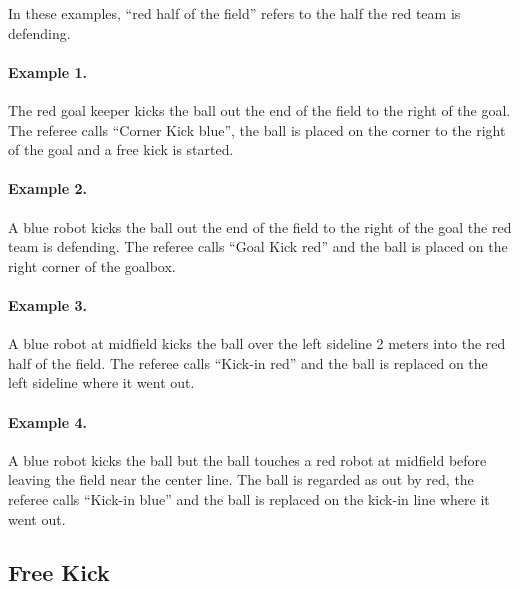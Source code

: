 \documentclass[12pt]{article}
\begin{document}

In these examples, ``red half of the field'' refers to the half the red team is defending.

\paragraph{Example 1.} The red goal keeper kicks the ball out the end of the field to the right of the goal. The referee calls ``Corner Kick blue'', the ball is placed on the corner to the right of the goal and a free kick is started.

\paragraph{Example 2.} A blue robot kicks the ball out the end of the field to the right of the goal the red team is defending. The referee calls ``Goal Kick red'' and the ball is placed on the right corner of the goalbox.

\paragraph{Example 3.} A blue robot at midfield kicks the ball over the left sideline 2 meters into the red half of the field. The referee calls ``Kick-in red'' and the ball is replaced on the left sideline where it went out.

\paragraph{Example 4.} A blue robot kicks the ball but the ball touches a red robot at midfield before leaving the field near the center line. The ball is regarded as out by red, the referee calls ``Kick-in blue'' and the ball is replaced on the kick-in line where it went out.

\subsection{Free Kick}
\label{sec:free_kick}
\end{document}
